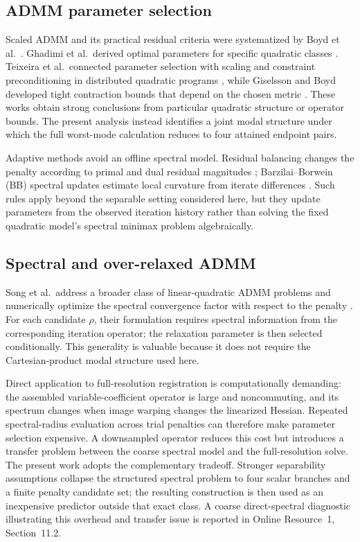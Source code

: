 \documentclass[pdflatex,iicol,sn-mathphys-num]{sn-jnl}
\theoremstyle{definition}
\begin{document}
\subsection{ADMM parameter selection}
Scaled ADMM and its practical residual criteria were systematized by Boyd
et al.\ \cite{Boyd2010}. Ghadimi et al.\ derived optimal parameters for
specific quadratic classes \cite{Ghadimi2015}. Teixeira et al.\ connected
parameter selection with scaling and constraint preconditioning in distributed
quadratic programs \cite{Teixeira2016}, while Giselsson and Boyd developed
tight contraction bounds that depend on the chosen metric
\cite{GiselssonBoyd2017}. These works obtain strong conclusions from particular
quadratic structure or operator bounds. The present analysis instead
identifies a joint modal structure under which the full worst-mode calculation
reduces to four attained endpoint pairs.

Adaptive methods avoid an offline spectral model. Residual balancing changes
the penalty according to primal and dual residual magnitudes
\cite{Wohlberg2017}; Barzilai--Borwein (BB) spectral updates estimate local
curvature from iterate differences \cite{Xu2017}. Such rules apply beyond the
separable setting considered here, but they update parameters from the
observed iteration history rather than solving the fixed quadratic model's
spectral minimax problem algebraically.

\subsection{Spectral and over-relaxed ADMM}
Song et al.\ address a broader class of linear-quadratic ADMM problems and
numerically optimize the spectral convergence factor with respect to the
penalty \cite{Song2024}. For each candidate $\rho$, their formulation requires
spectral information from the corresponding iteration operator; the
relaxation parameter is then selected conditionally. This generality is
valuable because it does not require the Cartesian-product modal structure
used here.

Direct application to full-resolution registration is computationally
demanding: the assembled variable-coefficient operator is large and
noncommuting, and its spectrum changes when image warping changes the
linearized Hessian. Repeated spectral-radius evaluation across trial penalties
can therefore make parameter selection expensive. A downsampled operator
reduces this cost but introduces a transfer problem between the coarse
spectral model and the full-resolution solve. The present work adopts the
complementary tradeoff. Stronger separability assumptions collapse the
structured spectral problem to four scalar branches and a finite penalty
candidate set; the resulting construction is then used as an inexpensive
predictor outside that exact class.
A coarse direct-spectral diagnostic illustrating this overhead and transfer
issue is reported in Online Resource~1, Section~11.2.
\end{document}
